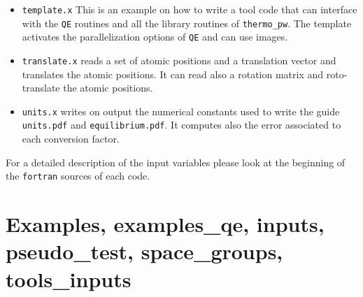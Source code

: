 \documentclass[12pt,a4paper,twoside]{report}
\begin{document}
\begin{itemize}
\item \texttt{template.x} This is an example on how to write a tool
code that can interface with the \texttt{QE} routines and all the
library routines of \texttt{thermo\_pw}. The template activates 
the parallelization options of \texttt{QE} and can use images.

\item \texttt{translate.x} reads a set of atomic positions and a translation
vector and translates the atomic positions. It can read also a rotation matrix 
and roto-translate the atomic positions.

\item \texttt{units.x} writes on output the numerical constants used
to write the guide \texttt{units.pdf} and \texttt{equilibrium.pdf}. 
It computes also the error associated to each conversion factor.

\end{itemize}

For a detailed description of the input variables please look at the beginning 
of the \texttt{fortran} sources of each code.

\newpage
{\color{dark-blue}\chapter{Examples, examples\_qe, inputs, pseudo\_test, space\_groups, \\ tools\_inputs}}
\color{black}
\end{document}
